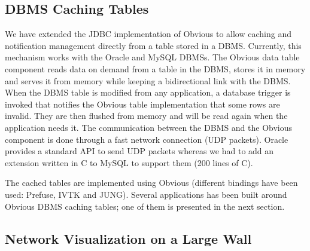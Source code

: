 \subsection{DBMS Caching Tables}
\label{dbmscachingtable}

We have extended the JDBC implementation of Obvious to allow caching
and notification management directly from a table stored in a DBMS.
Currently, this mechanism works with the Oracle and MySQL DBMSs.  The
Obvious data table component reads data on demand from a table in the
DBMS, stores it in memory and serves it from memory while keeping a
bidirectional link with the DBMS.  When the DBMS table is modified
from any application, a database trigger is invoked that notifies the
Obvious table implementation that some rows are invalid.  They are
then flushed from memory and will be read again when the application
needs it.  The communication between the DBMS and the Obvious
component is done through a fast network connection (UDP packets).
Oracle provides a standard API to send UDP packets whereas we had to
add an extension written in C to MySQL to support them (200 lines of
C).

The cached tables are implemented using Obvious (different bindings
have been used: Prefuse, IVTK and JUNG).  Several applications has
been built around Obvious DBMS caching tables; one of them is
presented in the next section.

\subsection{Network Visualization on a Large Wall}

